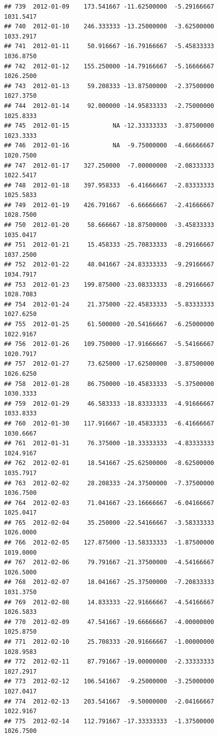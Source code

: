 \documentclass[
]{article}
\begin{document}
\begin{verbatim}
## 739  2012-01-09    173.541667 -11.62500000  -5.29166667    1031.5417
## 740  2012-01-10    246.333333 -13.25000000  -3.62500000    1033.2917
## 741  2012-01-11     50.916667 -16.79166667  -5.45833333    1036.8750
## 742  2012-01-12    155.250000 -14.79166667  -5.16666667    1026.2500
## 743  2012-01-13     59.208333 -13.87500000  -2.37500000    1027.3750
## 744  2012-01-14     92.000000 -14.95833333  -2.75000000    1025.8333
## 745  2012-01-15            NA -12.33333333  -3.87500000    1023.3333
## 746  2012-01-16            NA  -9.75000000  -4.66666667    1020.7500
## 747  2012-01-17    327.250000  -7.00000000  -2.08333333    1022.5417
## 748  2012-01-18    397.958333  -6.41666667  -2.83333333    1025.5833
## 749  2012-01-19    426.791667  -6.66666667  -2.41666667    1028.7500
## 750  2012-01-20     58.666667 -18.87500000  -3.45833333    1035.0417
## 751  2012-01-21     15.458333 -25.70833333  -8.29166667    1037.2500
## 752  2012-01-22     48.041667 -24.83333333  -9.29166667    1034.7917
## 753  2012-01-23    199.875000 -23.08333333  -8.29166667    1028.7083
## 754  2012-01-24     21.375000 -22.45833333  -5.83333333    1027.6250
## 755  2012-01-25     61.500000 -20.54166667  -6.25000000    1022.9167
## 756  2012-01-26    109.750000 -17.91666667  -5.54166667    1020.7917
## 757  2012-01-27     73.625000 -17.62500000  -3.87500000    1026.6250
## 758  2012-01-28     86.750000 -10.45833333  -5.37500000    1030.3333
## 759  2012-01-29     46.583333 -18.83333333  -4.91666667    1033.8333
## 760  2012-01-30    117.916667 -10.45833333  -6.41666667    1030.6667
## 761  2012-01-31     76.375000 -18.33333333  -4.83333333    1024.9167
## 762  2012-02-01     18.541667 -25.62500000  -8.62500000    1035.7917
## 763  2012-02-02     28.208333 -24.37500000  -7.37500000    1036.7500
## 764  2012-02-03     71.041667 -23.16666667  -6.04166667    1025.0417
## 765  2012-02-04     35.250000 -22.54166667  -3.58333333    1026.0000
## 766  2012-02-05    127.875000 -13.58333333  -1.87500000    1019.0000
## 767  2012-02-06     79.791667 -21.37500000  -4.54166667    1026.5000
## 768  2012-02-07     18.041667 -25.37500000  -7.20833333    1031.3750
## 769  2012-02-08     14.833333 -22.91666667  -4.54166667    1026.5833
## 770  2012-02-09     47.541667 -19.66666667  -4.00000000    1025.8750
## 771  2012-02-10     25.708333 -20.91666667  -1.00000000    1028.9583
## 772  2012-02-11     87.791667 -19.00000000  -2.33333333    1027.2917
## 773  2012-02-12    106.541667  -9.25000000  -3.25000000    1027.0417
## 774  2012-02-13    203.541667  -9.50000000  -2.04166667    1022.9167
## 775  2012-02-14    112.791667 -17.33333333  -1.37500000    1026.7500

\end{verbatim}
\end{document}

